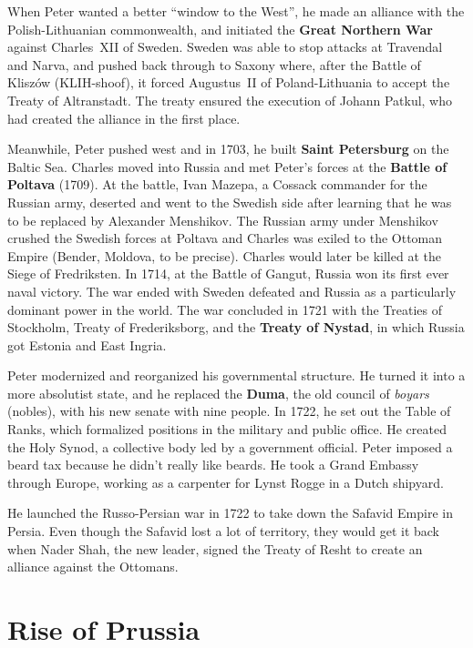 When Peter wanted a better ``window to the West'',
he made an alliance with the Polish-Lithuanian commonwealth,
and initiated the \textbf{Great Northern War} against Charles~XII of Sweden.
Sweden was able to stop attacks at Travendal and Narva,
and pushed back through to Saxony where, after the Battle of Klisz\'ow (KLIH-shoof),
it forced Augustus~II of Poland-Lithuania to accept the Treaty of Altranstadt.
The treaty ensured the execution of Johann Patkul, who had created the alliance in the first place.

Meanwhile, Peter pushed west and in 1703, he built \textbf{Saint Petersburg} on the Baltic Sea.
Charles moved into Russia and met Peter's forces at the \textbf{Battle of Poltava} (1709).
At the battle, Ivan Mazepa, a Cossack commander for the Russian army,
deserted and went to the Swedish side after learning that he was to be replaced by Alexander Menshikov.
The Russian army under Menshikov crushed the Swedish forces at Poltava
and Charles was exiled to the Ottoman Empire (Bender, Moldova, to be precise).
Charles would later be killed at the Siege of Fredriksten.
In 1714, at the Battle of Gangut, Russia won its first ever naval victory.
The war ended with Sweden defeated and Russia as a particularly dominant power in the world.
The war concluded in 1721 with the Treaties of Stockholm, Treaty of Frederiksborg, and the \textbf{Treaty of Nystad},
in which Russia got Estonia and East Ingria.

Peter modernized and reorganized his governmental structure.
He turned it into a more absolutist state, and he replaced the \textbf{Duma},
the old council of \textit{boyars} (nobles),
with his new senate with nine people.
In 1722, he set out the Table of Ranks, which formalized positions in the military and public office.
He created the Holy Synod, a collective body led by a government official.
Peter imposed a beard tax because he didn't really like beards.
He took a Grand Embassy through Europe, working as a carpenter for Lynst Rogge in a Dutch shipyard.

He launched the Russo-Persian war in 1722 to take down the Safavid Empire in Persia.
Even though the Safavid lost a lot of territory, they would get it back when
Nader Shah, the new leader, signed the Treaty of Resht to create an alliance against the Ottomans.

\section{Rise of Prussia}

